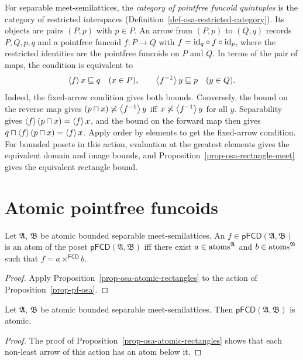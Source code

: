 For separable
meet-semilattices, the \emph{category of pointfree funcoid quintuples}
is the category of restricted interspaces
(Definition~\ref{def-osa-restricted-category}). Its objects are pairs
$(P,p)$ with $p\in P$. An arrow from $(P,p)$ to $(Q,q)$ records
$P,Q,p,q$ and a pointfree funcoid $f:P\to Q$ with
$f={\operatorname{id}}_q\circ f\circ{\operatorname{id}}_p$, where the restricted identities are
the pointfree funcoids on $P$ and $Q$. In terms of the pair of maps,
the condition is equivalent to
\begin{equation}\label{pffcd-cat-cr}
 \left\langle f\right\rangle x\sqsubseteq q\quad(x\in P),\qquad
 \left\langle f^{-1}\right\rangle y\sqsubseteq p\quad(y\in Q).
\end{equation}
Indeed, the fixed-arrow condition gives both bounds. Conversely, the
bound on the reverse map gives
$(p\sqcap x)\not\asymp\left\langle f^{-1}\right\rangle y$ iff
$x\not\asymp\left\langle f^{-1}\right\rangle y$ for all $y$. Separability gives
$\left\langle f\right\rangle(p\sqcap x)=\left\langle f\right\rangle x$, and the bound on the forward map
then gives $q\sqcap\left\langle f\right\rangle(p\sqcap x)=\left\langle f\right\rangle x$.
Apply order by elements to get the fixed-arrow condition.
For bounded posets in this action, evaluation at the greatest
elements gives the equivalent domain and image bounds, and
Proposition~\ref{prop-osa-rectangle-meet} gives the equivalent
rectangle bound.

\section{Atomic pointfree funcoids}
\begin{thm}
\label{pf-atom}Let $\mathfrak{A}$, $\mathfrak{B}$ be atomic bounded separable meet-semilattices.
An $f\in\mathsf{pFCD}(\mathfrak{A},\mathfrak{B})$
is an atom of the poset $\mathsf{pFCD}(\mathfrak{A},\mathfrak{B})$
iff there exist $a\in\operatorname{atoms}^{\mathfrak{A}}$ and $b\in\operatorname{atoms}^{\mathfrak{B}}$
such that $f=a\times^{\mathsf{FCD}}b$.\end{thm}
\begin{proof}
Apply Proposition~\ref{prop-osa-atomic-rectangles} to the
action of Proposition~\ref{prop-pf-osa}.
\end{proof}
\begin{thm}\label{pfcd-atomic}
Let $\mathfrak{A}$, $\mathfrak{B}$ be atomic bounded separable meet-semilattices.
Then $\mathsf{pFCD}(\mathfrak{A},\mathfrak{B})$ is atomic.\end{thm}
\begin{proof}
The proof of Proposition~\ref{prop-osa-atomic-rectangles} shows that
each non-least arrow of this action has an atom below it.
\end{proof}

